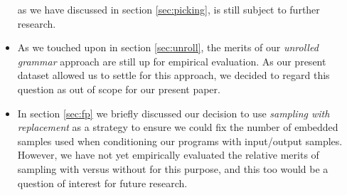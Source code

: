 \documentclass{article}
\begin{document}
\begin{itemize}
    as we have discussed in section \ref{sec:picking}, is still subject to further research.
    \item As we touched upon in section \ref{sec:unroll},
    the merits of our \emph{unrolled grammar} approach are still up for empirical evaluation.
    As our present dataset allowed us to settle for this approach,
    we decided to regard this question as out of scope for our present paper.
    \item In section \ref{sec:fp} we briefly discussed our decision to use
    \emph{sampling with replacement} as a strategy to ensure we could fix
    the number of embedded samples used when conditioning our programs
    with input/output samples.
    However, we have not yet empirically evaluated the relative merits of
    sampling with versus without for this purpose,
    and this too would be a question of interest for future research.
\end{itemize}


\nocite{*}
% 

\end{document}
